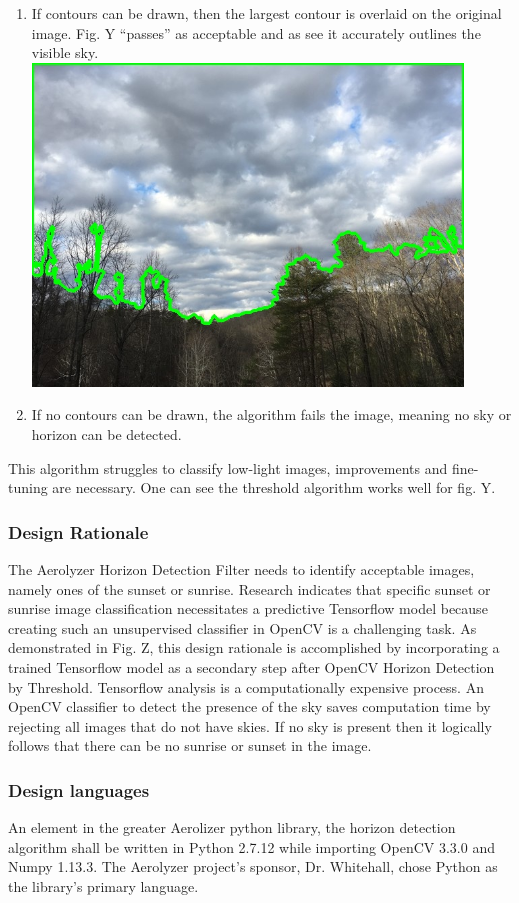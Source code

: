 \documentclass[onecolumn, draftclsnofoot,10pt, compsoc]{IEEEtran}
\begin{document}
\begin{singlespace}
\begin{enumerate}
						\item If contours can be drawn, then the largest contour is overlaid on the original image.
		Fig.
		Y “passes” as acceptable and as see it accurately outlines the visible sky.\\
							\includegraphics[width=4.5in,natwidth=640,natheight=480]{images/threshold/9.jpg}
						\item If no contours can be drawn, the algorithm fails the image, meaning no sky or horizon can be detected.\\
					\end{enumerate}
					This algorithm struggles to classify low-light images, improvements and fine-tuning are necessary.
		One can see the threshold algorithm works well for fig.
		Y.

      \subsubsection{Design Rationale}
      	The Aerolyzer Horizon Detection Filter needs to identify acceptable images, namely ones of the sunset or sunrise.
		Research indicates that specific sunset or sunrise image classification  necessitates a predictive Tensorflow model because creating such an unsupervised classifier in OpenCV is a challenging task.
		As demonstrated in Fig.
		Z, this design rationale is accomplished by incorporating a trained Tensorflow model as a secondary step after OpenCV Horizon Detection by Threshold.
		Tensorflow analysis is a computationally expensive process.
		An OpenCV classifier to detect the presence of the sky saves computation time by rejecting all images that do not have skies.
		If no sky is present then it logically follows that there can be no sunrise or sunset in the image.

      \subsubsection{Design languages}
      	An element in the greater Aerolizer python library, the horizon detection algorithm shall be written in Python 2.7.12 while importing OpenCV 3.3.0 and Numpy 1.13.3.
		The Aerolyzer project’s sponsor, Dr.
		Whitehall, chose Python as the library’s primary language.
		

\end{singlespace}
\end{document}
